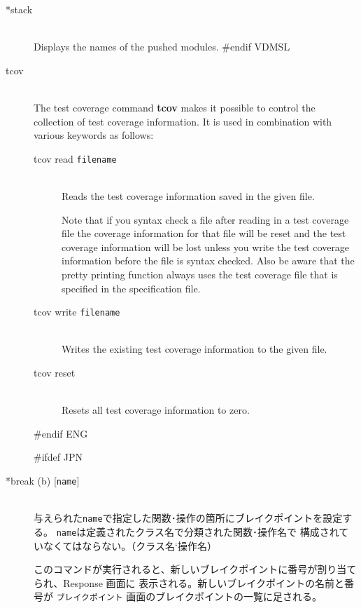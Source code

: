 \documentclass[\pformat,12pt]{article}
\newcommand{\guicmd}[1]{{\sf #1}}
\newcommand{\guicmd}[1]{{\gt #1}}
\begin{document}
\begin{description}
\item[*stack]\mbox{}\\
  Displays the names of the pushed modules.
#endif VDMSL

\item[tcov]\mbox{}\\
The test coverage command {\bf tcov} makes it possible to control 
the collection of test coverage information. It is used in combination 
with various keywords as follows:

\begin{description}
\item[tcov read \mbox{\texttt{filename}}] \mbox{}\\ 
  Reads the test coverage information saved in the given file.
  
  Note that if you syntax check a file after reading in a test coverage 
  file the coverage information for that file will be reset and the test coverage
  information will be lost unless you  write the test coverage information
  before the file is syntax checked.
  Also be aware that the pretty printing function always uses the test coverage
  file that is specified in the specification file.

\item[tcov write \mbox{\texttt{filename}}] \mbox{} \\ 
  Writes the existing test coverage information to the given file.
  
\item[tcov reset] \mbox{} \\
  Resets all test coverage information to zero.
  
\end{description}
#endif ENG

#ifdef JPN
\item[*break (b) \mbox{[{\tt name}]}] 
\mbox{}\\
  与えられた{\tt name}で指定した関数･操作の箇所にブレイクポイントを設定する。
%
{%
{\tt name}は定義されたクラス名で分類された関数･操作名で
構成されていなくてはならない。（クラス名`操作名）
}%
{%
}

  このコマンドが実行されると、新しいブレイクポイントに番号が割り当てられ、\guicmd{Response} 画面に
  表示される。新しいブレイクポイントの名前と番号が \texttt{ブレイクポイント} 画面のブレイクポイントの一覧に足される。


\end{description}
\end{document}
